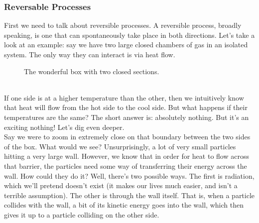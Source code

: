 \subsubsection{Reversable Processes}
First we need to talk about reversible processes. A reversible process, broadly speaking, is one that can spontaneously take place in both directions. Let's take a look at an example: say we have two large closed chambers of gas in an isolated system. The only way they can interact is via heat flow.
\begin{figure}[h!]
    \centering
{}
    \caption{The wonderful box with two closed sections.}
\end{figure}
\\ If one side is at a higher temperature than the other, then we intuitively know that heat will flow from the hot side to the cool side. But what happens if their temperatures are the same? The short answer is: absolutely nothing. But it's an exciting nothing! Let's dig even deeper. \\
\newline
Say we were to zoom in extremely close on that boundary between the two sides of the box. What would we see? Unsurprisingly, a lot of very small particles hitting a very large wall. However, we know that in order for heat to flow across that barrier, the particles need some way of transferring their energy across the wall. How could they do it? Well, there's two possible ways. The first is radiation, which we'll pretend doesn't exist (it makes our lives much easier, and isn't a terrible assumption). The other is through the wall itself. That is, when a particle collides with the wall, a bit of its kinetic energy goes into the wall, which then gives it up to a particle colliding on the other side.
